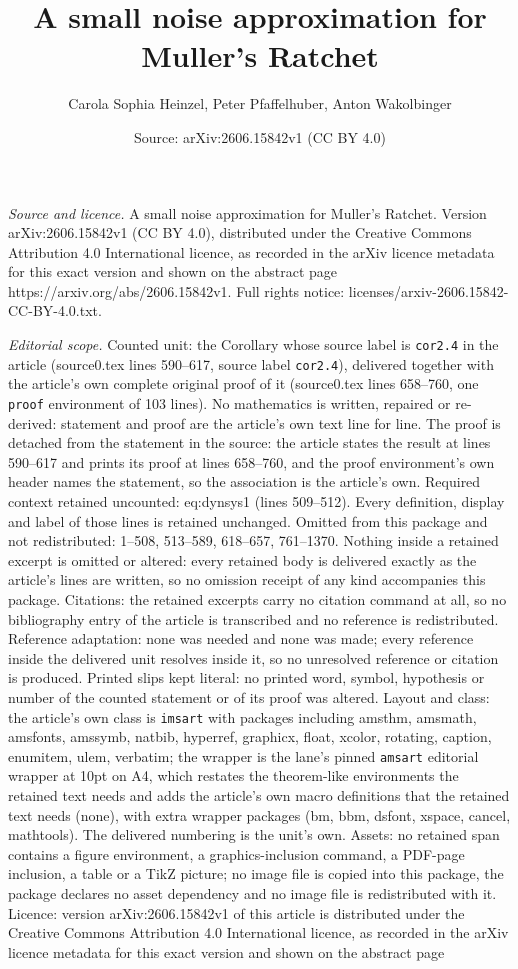 \documentclass[10pt,a4paper]{amsart}
\title[A small noise approximation for Muller's Ratchet]{A small noise approximation for Muller's Ratchet}
\author{Carola Sophia Heinzel, Peter Pfaffelhuber, Anton Wakolbinger}
\date{Source: arXiv:2606.15842v1 (CC BY 4.0)}
\begin{document}
\maketitle

\noindent\emph{Source and licence.} A small noise approximation for Muller's Ratchet. Version arXiv:2606.15842v1 (CC BY 4.0), distributed under the Creative Commons Attribution 4.0 International licence, as recorded in the arXiv licence metadata for this exact version and shown on the abstract page https://arxiv.org/abs/2606.15842v1. Full rights notice: licenses/arxiv-2606.15842-CC-BY-4.0.txt.\par\smallskip

\noindent\textit{Editorial scope.} Counted unit: the Corollary whose source label is \texttt{cor2.4} in the article (source0.tex lines 590--617, source label \texttt{cor2.4}), delivered together with the article's own complete original proof of it (source0.tex lines 658--760, one \texttt{proof} environment of 103 lines). No mathematics is written, repaired or re-derived: statement and proof are the article's own text line for line. The proof is detached from the statement in the source: the article states the result at lines 590--617 and prints its proof at lines 658--760, and the proof environment's own header names the statement, so the association is the article's own. Required context retained uncounted: eq:dynsys1 (lines 509--512). Every definition, display and label of those lines is retained unchanged. Omitted from this package and not redistributed: 1--508, 513--589, 618--657, 761--1370. Nothing inside a retained excerpt is omitted or altered: every retained body is delivered exactly as the article's lines are written, so no omission receipt of any kind accompanies this package. Citations: the retained excerpts carry no citation command at all, so no bibliography entry of the article is transcribed and no reference is redistributed. Reference adaptation: none was needed and none was made; every reference inside the delivered unit resolves inside it, so no unresolved reference or citation is produced. Printed slips kept literal: no printed word, symbol, hypothesis or number of the counted statement or of its proof was altered. Layout and class: the article's own class is \texttt{imsart} with packages including amsthm, amsmath, amsfonts, amssymb, natbib, hyperref, graphicx, float, xcolor, rotating, caption, enumitem, ulem, verbatim; the wrapper is the lane's pinned \texttt{amsart} editorial wrapper at 10pt on A4, which restates the theorem-like environments the retained text needs and adds the article's own macro definitions that the retained text needs (none), with extra wrapper packages (bm, bbm, dsfont, xspace, cancel, mathtools). The delivered numbering is the unit's own. Assets: no retained span contains a figure environment, a graphics-inclusion command, a PDF-page inclusion, a table or a TikZ picture; no image file is copied into this package, the package declares no asset dependency and no image file is redistributed with it. Licence: version arXiv:2606.15842v1 of this article is distributed under the Creative Commons Attribution 4.0 International licence, as recorded in the arXiv licence metadata for this exact version and shown on the abstract page 
\end{document}
